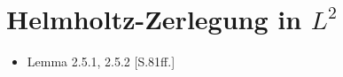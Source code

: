 \chapter{Helmholtz-Zerlegung in $L^2$}

\begin{itemize}
  \item Lemma 2.5.1, 2.5.2 \cite{sohr2001navier}[S.81ff.]
\end{itemize}

